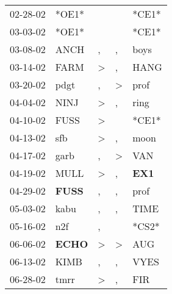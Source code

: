 \begin{supertabular}{p{0.07\textwidth}p{0.06\textwidth}p{0.02\textwidth}p{0.02\textwidth}p{0.06\textwidth}}
 02-28-02\textsuperscript{} &                            *OE1* &               &               &                            *CE1* \\
 03-03-02\textsuperscript{} &                            *OE1* &               &               &                            *CE1* \\
 03-08-02\textsuperscript{} &           ANCH\textsuperscript{} &             , &             , &           boys\textsuperscript{} \\
 03-14-02\textsuperscript{} &           FARM\textsuperscript{} &  \textgreater &             , &           HANG\textsuperscript{} \\
 03-20-02\textsuperscript{} &           pdgt\textsuperscript{} &             , &  \textgreater &           prof\textsuperscript{} \\
 04-04-02\textsuperscript{} &           NINJ\textsuperscript{} &  \textgreater &             , &           ring\textsuperscript{} \\
 04-10-02\textsuperscript{} &           FUSS\textsuperscript{} &  \textgreater &               &                            *CE1* \\
 04-13-02\textsuperscript{} &            sfb\textsuperscript{} &  \textgreater &             , &           moon\textsuperscript{} \\
 04-17-02\textsuperscript{} &           garb\textsuperscript{} &             , &  \textgreater &            VAN\textsuperscript{} \\
 04-19-02\textsuperscript{} &           MULL\textsuperscript{} &  \textgreater &             , &   \textbf{EX1\textsuperscript{}} \\
 04-29-02\textsuperscript{} &  \textbf{FUSS\textsuperscript{}} &             , &             , &           prof\textsuperscript{} \\
 05-03-02\textsuperscript{} &           kabu\textsuperscript{} &             , &             , &           TIME\textsuperscript{} \\
 05-16-02\textsuperscript{} &            n2f\textsuperscript{} &             , &               &                            *CS2* \\
 06-06-02\textsuperscript{} &  \textbf{ECHO\textsuperscript{}} &  \textgreater &  \textgreater &            AUG\textsuperscript{} \\
 06-13-02\textsuperscript{} &           KIMB\textsuperscript{} &             , &             , &           VYES\textsuperscript{} \\
 06-28-02\textsuperscript{} &           tmrr\textsuperscript{} &  \textgreater &             , &            FIR\textsuperscript{} \\

\end{supertabular}

